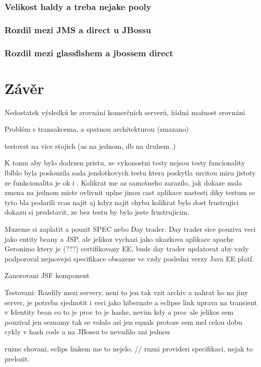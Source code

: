 \documentclass[122pt,oneside]{fithesis}
\begin{document}
\subsection{Velikost haldy a treba nejake pooly}
\subsection{Rozdil mezi JMS a direct u JBossu}
\subsection{Rozdil mezi glassfishem a jbossem direct}


\chapter*{Závěr}

Nedostatek výsledků ke srovnání komerčních serverů, žádná možnost srovnání 

Problém s transakcema, a spatnou architekturou (smazano)

testovat na vice stojich (as na jednom, db na druhem..)

K tomu aby bylo dodrzen pristu, ze vykonostni testy nejsou testy funcionality lblblo byla poslouzila sada jendotkovych testu ktera poskytla urcitou miru jistoty ze funkcionalita je ok i . Kolikrat me az samotneho zarazilo, jak dokaze mala zmena na jednom miste ovlivnit uplne jinou cast aplikace nastesti diky testum se tyto bla podarili vcas najit aj kdyz najit chybu kolikrat bylo dost frustrujici dokazu si predstavit, ze bez testu by bylo jeste frustrujicim.

Muzeme si zaplatit a pouzit SPEC nebo Day trader. Day trader sice pouziva veci jako entity beany a JSP, ale jelikoz vychazi jako ukazkova aplikace apache Geronimo ktery je (???) certifikovany EE, bude day trader updatovat aby vzdy podporoval nejnovejsi specifikace obsazene ve vzdy posledni verzy Java EE platf.

Zanorovani JSF komponent

Testovani: Rozdily mezi servery, neni to jen tak vzit archiv a nahrat ho na jiny server, je potreba sjednotit i veci jako hibernate a eclipse link
uprava na transient v Identity bean co to je proc to je
hashe, nevim kdy a proc ale jelikos sem pouzival jen seznamy tak se volalo asi jen equals protoze sem mel celou dobu cykly v hash code a na JBossu to nevadilo ani jednou

ruzne chovani, eclips linkem me to nejelo. // ruzni provideri specifikaci, nejak to prelozit.
\end{document}

